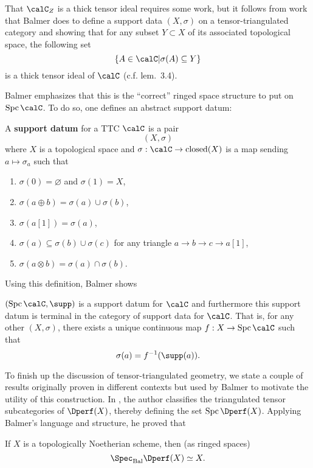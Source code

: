 \documentclass[12pt]{article}
\DeclareMathOperator{\Spc}{Spc}
\begin{document}
\begin{rmk}
	That $\calC_Z$ is a thick tensor ideal requires some work, but it follows from work that Balmer does to 
	define a support data $(X,\sigma)$ on a tensor-triangulated category and showing that for any subset $Y\subset X$ of 
	its associated topological space, the following set 
	\[\{A\in\calC|\sigma(A)\subseteq Y\}\]
	is a thick tensor ideal of $\calC$ (c.f. lem.~3.4).
\end{rmk}

Balmer emphasizes that this is the ``correct'' ringed space structure to put on $\Spc\calC$. To do so, one defines an abstract support datum:
\begin{defn}
	A \textbf{support datum} for a TTC $\calC$ is a pair 
	\[(X,\sigma)\]
	where $X$ is a topological space and $\sigma:\calC\to \operatorname{closed}(X)$ is a map sending $a\mapsto\sigma_a$ such that 
	\begin{enumerate}
		\item $\sigma(0)=\varnothing$ and $\sigma(1)=X$,
		\item $\sigma(a\oplus b)=\sigma(a)\cup\sigma(b)$,
		\item $\sigma (a[1])=\sigma(a)$,
		\item $\sigma(a)\subseteq \sigma(b)\cup\sigma(c)$ for any triangle $a\to b\to c\to a[1]$,
		\item $\sigma(a\otimes b)=\sigma(a)\cap\sigma(b).$
	\end{enumerate}
\end{defn}
Using this definition, Balmer shows 
\begin{thm}
	$(\Spc\calC,\supp)$ is a support datum for $\calC$ and furthermore this support datum is terminal in the category of 
	support data for $\calC$. That is, for any other $(X,\sigma)$, there exists a unique continuous map $f:X\to \Spc\calC$ such that 
	\[\sigma(a)=f^{-1}(\supp(a)).\]
\end{thm}

To finish up the discussion of tensor-triangulated geometry, we state a couple of results originally proven in different contexts but used 
by Balmer to motivate the utility of this construction. In \cite{thomason}, the author classifies the triangulated tensor subcategories 
of $\Dperf(X)$, thereby defining the set $\Spc\Dperf(X)$. Applying Balmer's language and structure, he proved that 
\begin{thm}
	If $X$ is a topologically Noetherian scheme, then (as ringed spaces)
	\[\Spec_\text{Bal}\Dperf(X)\simeq X.\]
\end{thm}
\end{document}
